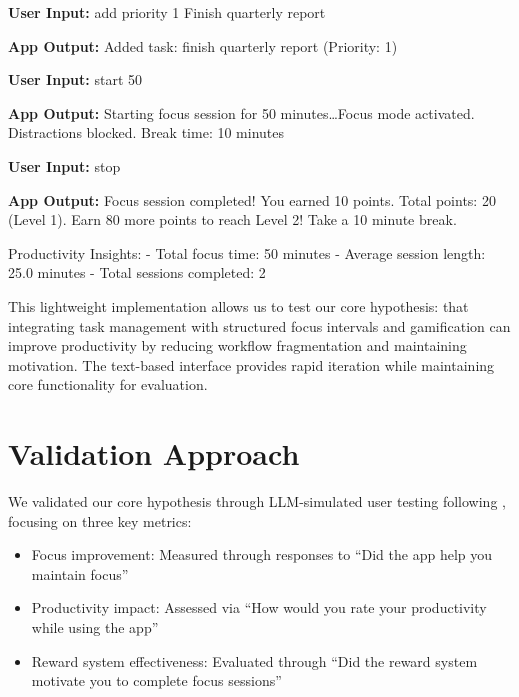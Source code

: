 \documentclass{article} %
\begin{document}
\begin{Userinput}
\textbf{User Input:} add priority 1 Finish quarterly report
\end{Userinput}

\begin{Appoutput}
\textbf{App Output:} Added task: finish quarterly report (Priority: 1)
\end{Appoutput}

\begin{Userinput}
\textbf{User Input:} start 50
\end{Userinput}

\begin{Appoutput}
\textbf{App Output:} Starting focus session for 50 minutes\ldots Focus mode activated. Distractions blocked. Break time: 10 minutes
\end{Appoutput}

\begin{Userinput}
\textbf{User Input:} stop
\end{Userinput}

\begin{Appoutput}
\textbf{App Output:} Focus session completed! You earned 10 points. Total points: 20 (Level 1). Earn 80 more points to reach Level 2! Take a 10 minute break.

Productivity Insights:
- Total focus time: 50 minutes
- Average session length: 25.0 minutes
- Total sessions completed: 2
\end{Appoutput}

This lightweight implementation allows us to test our core hypothesis: that integrating task management with structured focus intervals and gamification can improve productivity by reducing workflow fragmentation and maintaining motivation. The text-based interface provides rapid iteration while maintaining core functionality for evaluation.



\section{Validation Approach}
\label{sec:validation_approach}

We validated our core hypothesis through LLM-simulated user testing following \citet{lu2024aiscientist}, focusing on three key metrics:

\begin{itemize}
    \item Focus improvement: Measured through responses to ``Did the app help you maintain focus''
    \item Productivity impact: Assessed via ``How would you rate your productivity while using the app''
    \item Reward system effectiveness: Evaluated through ``Did the reward system motivate you to complete focus sessions''
\end{itemize}
\end{document}
